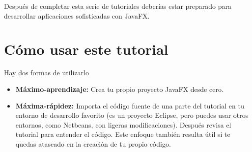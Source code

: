 Después de completar esta serie de tutoriales deberías estar preparado para desarrollar aplicaciones sofisticadas con JavaFX.
\section*{Cómo usar este tutorial}
Hay dos formas de utilizarlo
\begin{itemize}
	\item \textbf{Máximo-aprendizaje:} Crea tu propio proyecto JavaFX desde cero.
	\item \textbf{Máxima-rápidez:} Importa el código fuente de una parte del tutorial en tu entorno de desarrollo favorito (es un proyecto Eclipse, pero puedes usar otros entornos, como Netbeans, con ligeras modificaciones). Después revisa el tutorial para entender el código. Este enfoque también resulta útil si te quedas atascado en la creación de tu propio código.
\end{itemize}

